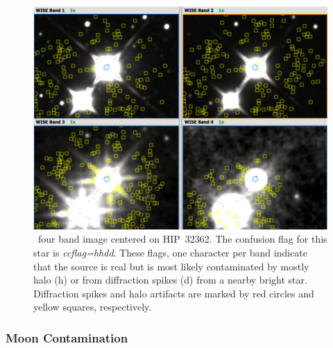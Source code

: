         \begin{figure}
        \centering
        \includegraphics[width=\textwidth]{Ch2/ccflag_hhdd_HIP32362}
        \caption[Contamination From Optical Articats]{\WS\ four band image centered on HIP~32362. The confusion flag for this star is \textit{ccflag=hhdd}. These flags, one character per band indicate that the source is real but is most likely contaminated by mostly halo (h) or from diffraction spikes (d) from a nearby bright star. Diffraction spikes and halo artifacts are marked by red circles and yellow squares, respectively.}
        \label{fig:ccflag_contamination}
        \end{figure}
        
    
        \subsubsection{Moon Contamination}
        
